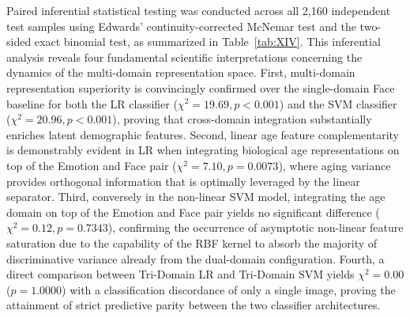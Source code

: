 Paired inferential statistical testing was conducted across all 2,160 independent test samples using Edwards' continuity-corrected McNemar test and the two-sided exact binomial test, as summarized in Table~\ref{tab:XIV}. This inferential analysis reveals four fundamental scientific interpretations concerning the dynamics of the multi-domain representation space. First, multi-domain representation superiority is convincingly confirmed over the single-domain Face baseline for both the LR classifier ($\chi^2 = 19.69, p < 0.001$) and the SVM classifier ($\chi^2 = 20.96, p < 0.001$), proving that cross-domain integration substantially enriches latent demographic features. Second, linear age feature complementarity is demonstrably evident in LR when integrating biological age representations on top of the Emotion and Face pair ($\chi^2 = 7.10, p = 0.0073$), where aging variance provides orthogonal information that is optimally leveraged by the linear separator. Third, conversely in the non-linear SVM model, integrating the age domain on top of the Emotion and Face pair yields no significant difference ($\chi^2 = 0.12, p = 0.7343$), confirming the occurrence of asymptotic non-linear feature saturation due to the capability of the RBF kernel to absorb the majority of discriminative variance already from the dual-domain configuration. Fourth, a direct comparison between Tri-Domain LR and Tri-Domain SVM yields $\chi^2 = 0.00$ ($p = 1.0000$) with a classification discordance of only a single image, proving the attainment of strict predictive parity between the two classifier architectures.

\begin{table}[htbp]
\caption{Paired Inferential Hypothesis Testing Across Multi-Domain Configurations.}
\label{tab:14}
\label{tab:XIV}
\centering
\footnotesize
{}
\end{table}

